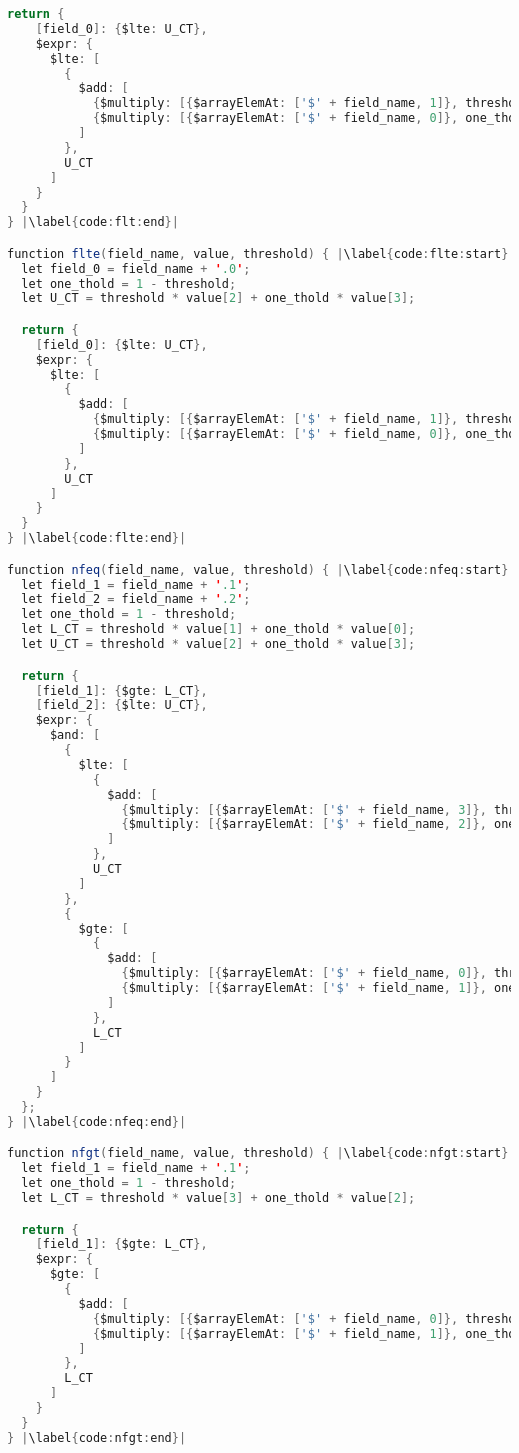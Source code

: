 \begin{lstlisting}[language=java, escapechar=|]
  return {
    [field_0]: {$lte: U_CT},
    $expr: {
      $lte: [
        {
          $add: [
            {$multiply: [{$arrayElemAt: ['$' + field_name, 1]}, threshold]},
            {$multiply: [{$arrayElemAt: ['$' + field_name, 0]}, one_thold]}
          ]
        },
        U_CT
      ]
    }
  }
} |\label{code:flt:end}|

function flte(field_name, value, threshold) { |\label{code:flte:start}|
  let field_0 = field_name + '.0';
  let one_thold = 1 - threshold;
  let U_CT = threshold * value[2] + one_thold * value[3];

  return {
    [field_0]: {$lte: U_CT},
    $expr: {
      $lte: [
        {
          $add: [
            {$multiply: [{$arrayElemAt: ['$' + field_name, 1]}, threshold]},
            {$multiply: [{$arrayElemAt: ['$' + field_name, 0]}, one_thold]}
          ]
        },
        U_CT
      ]
    }
  }
} |\label{code:flte:end}|

function nfeq(field_name, value, threshold) { |\label{code:nfeq:start}|
  let field_1 = field_name + '.1';
  let field_2 = field_name + '.2';
  let one_thold = 1 - threshold;
  let L_CT = threshold * value[1] + one_thold * value[0];
  let U_CT = threshold * value[2] + one_thold * value[3];

  return {
    [field_1]: {$gte: L_CT},
    [field_2]: {$lte: U_CT},
    $expr: {
      $and: [
        {
          $lte: [
            {
              $add: [
                {$multiply: [{$arrayElemAt: ['$' + field_name, 3]}, threshold]},
                {$multiply: [{$arrayElemAt: ['$' + field_name, 2]}, one_thold]}
              ]
            },
            U_CT
          ]
        },
        {
          $gte: [
            {
              $add: [
                {$multiply: [{$arrayElemAt: ['$' + field_name, 0]}, threshold]},
                {$multiply: [{$arrayElemAt: ['$' + field_name, 1]}, one_thold]}
              ]
            },
            L_CT
          ]
        }
      ]
    }
  };
} |\label{code:nfeq:end}|

function nfgt(field_name, value, threshold) { |\label{code:nfgt:start}|
  let field_1 = field_name + '.1';
  let one_thold = 1 - threshold;
  let L_CT = threshold * value[3] + one_thold * value[2];

  return {
    [field_1]: {$gte: L_CT},
    $expr: {
      $gte: [
        {
          $add: [
            {$multiply: [{$arrayElemAt: ['$' + field_name, 0]}, threshold]},
            {$multiply: [{$arrayElemAt: ['$' + field_name, 1]}, one_thold]}
          ]
        },
        L_CT
      ]
    }
  }
} |\label{code:nfgt:end}|


\end{lstlisting}
